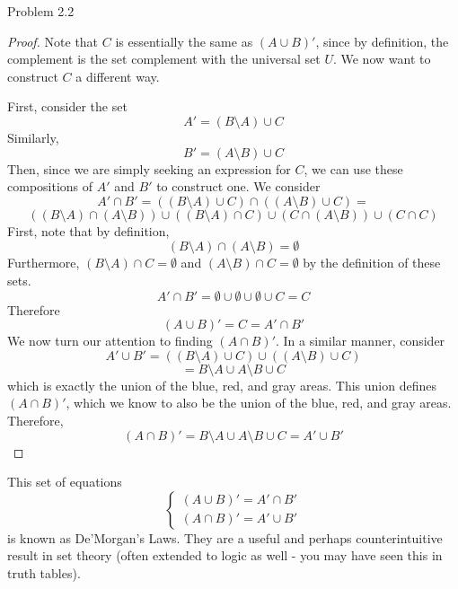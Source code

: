 \begin{sol} {Problem 2.2}
\begin{proof}
Note that $C$ is essentially the same as $(A \cup B)'$, since by definition, the complement is the set complement with the universal set $U$. We now want to construct $C$ a different way. 

First, consider the set 
\[
A' = (B \setminus A) \cup C
\]
Similarly, 
\[
B' = (A \setminus B) \cup C
\]
Then, since we are simply seeking an expression for $C$, we can use these compositions of $A'$ and $B'$ to construct one. We consider
\[
A' \cap B' = ((B \setminus A) \cup C) \cap ((A \setminus B) \cup C) = 
\]
\[
((B \setminus A) \cap (A \setminus B)) \cup ( (B \setminus A) \cap C) \cup (C \cap (A \setminus B)) \cup (C \cap C)
\]
First, note that by definition,
\[
(B \setminus A) \cap (A \setminus B) = \emptyset
\]
Furthermore, $(B \setminus A) \cap C = \emptyset$ and $(A \setminus B) \cap C = \emptyset$ by the definition of these sets.
\[
A' \cap B' = \emptyset\cup \emptyset\cup\emptyset\cup C = C
\]
Therefore
\[
(A \cup B)' = C = A' \cap B'
\]
We now turn our attention to finding $(A \cap B)'$. In a similar manner, consider 
\[
A' \cup B' = ((B \setminus A) \cup C) \cup ((A \setminus B) \cup C)
\]
\[
= B \setminus A \cup A \setminus B \cup C
\]
which is exactly the union of the blue, red, and gray areas. This union defines $(A \cap B)'$, which we know to also be the union of the blue, red, and gray areas. Therefore, 
\[
(A \cap B)' = B \setminus A \cup A \setminus B \cup C = A' \cup B'
\]
\end{proof}

This set of equations
\[
\begin{cases}
(A \cup B)' = A' \cap B' \\
(A \cap B)' = A' \cup B'
\end{cases}
\]
is known as De'Morgan's Laws. They are a useful and perhaps counterintuitive result in set theory (often extended to logic as well - you may have seen this in truth tables). 
\end{sol}

